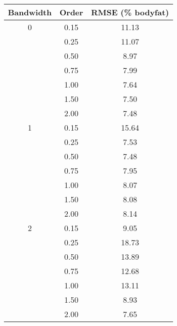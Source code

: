 \begin{tabular}{ccc}
\toprule
 Bandwidth &  Order & RMSE (\% bodyfat) \\
\midrule
    0 &  0.15 &             11.13 \\
      & 0.25 &            11.07 \\
      & 0.50 &              8.97 \\
     &  0.75 &               7.99 \\
     &  1.00 &             7.64 \\
    &   1.50 &               7.50 \\
    &   2.00 &              7.48 \\
\midrule
   1 &    0.15 &          15.64 \\
    &   0.25 &               7.53 \\
 &      0.50 &                7.48 \\
    &   0.75 &                7.95 \\
     &  1.00 &               8.07 \\
    &   1.50 &                8.08 \\
   &    2.00 &                8.14 \\
 \midrule
 2 &      0.15 &                 9.05 \\
   &    0.25 &                 18.73 \\
    &   0.50 &               13.89 \\
     &  0.75 &                  12.68 \\
    &   1.00 &                  13.11 \\
    &   1.50 &                 8.93 \\
    &   2.00 &                  7.65 \\
\bottomrule
\end{tabular}
